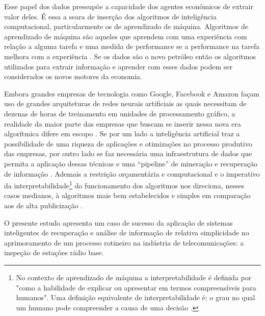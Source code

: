 \documentclass[
	12pt,				%
	openany,			%
	oneside,			%
	a4paper,			%
	english,			%
	french,				%
	spanish,			%
	brazil,				%
	]{abntex2}
\begin{document}
Esse papel dos dados pressupõe a capacidade dos agentes econômicos de extrair
valor deles. É essa a seara de inserção dos algoritmos de inteligência
computacional, particularmente os de aprendizado de máquina. Algoritmos de
aprendizado de máquina são aqueles que aprendem com uma experiência com relação
a alguma tarefa e uma medida de performance se a performance na tarefa melhora
com a experiência \cite{carbonell1984machine}. Se os dados são o novo petróleo
então os algoritmos utilizados para extrair informação e aprender com esses
dados podem ser considerados os novos motores da economia.

Embora grandes empresas de tecnologia como Google, Facebook e Amazon façam uso
de grandes arquiteturas de redes neurais artificiais as quais necessitam de
dezenas de horas de treinamento em unidades de processamento gráfico, a
realidade da maior parte das empresas que buscam se inserir nessa nova era
algorítmica difere em escopo \cite{canziani2016analysis}. Se por um lado a
inteligência artificial traz a possibilidade de uma riqueza de aplicações e
otimizações no processo produtivo das empresas, por outro lado se faz necessária
uma infraestrutura de dados que permita a aplicação dessas técnicas e uma
``pipeline'' de mineração e recuperação de informação
\cite{schutze2007introduction}. Ademais a restrição orçamentária e computacional
e o imperativo da interpretabilidade\footnote{No contexto de aprendizado de
  máquina a interpretabilidade é definida por 
  "como a habilidade de explicar ou apresentar em termos compreensíveis para
  humanos". Uma definição equivalente de interpretabilidade é: o grau no qual um
  humano pode compreender a causa de uma decisão \cite{miller2018explanation}.}
do funcionamento dos algoritmos nos direciona, nesses casos medianos, à
algoritmos mais bem estabelecidos e simples em comparação aos de alta
publicização \cite{dreiseitl2002logistic}.

O presente estudo apresenta um caso de sucesso da aplicação de sistemas
inteligentes de recuperação e análise de informação de relativa simplicidade no
aprimoramento de um processo rotineiro na indústria de telecomunicações: a
inspeção de estações rádio base.
\end{document}
